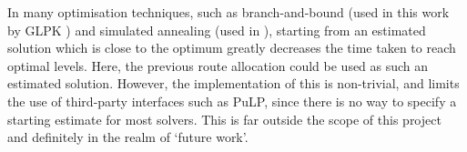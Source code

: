 In many optimisation techniques, such as branch-and-bound (used in this work by GLPK \cite{glpk}) and simulated annealing (used in \cite{alfares:hedera}), starting from an estimated solution which is close to the optimum greatly decreases the time taken to reach optimal levels. Here, the previous route allocation could be used as such an estimated solution. However, the implementation of this is non-trivial, and limits the use of third-party interfaces such as PuLP, since there is no way to specify a starting estimate for most solvers. This is far outside the scope of this project and definitely in the realm of `future work'.
